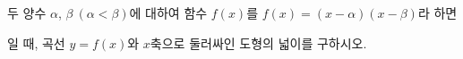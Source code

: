 두 양수 $\alpha$, $\beta\ (\alpha<\beta)$에 대하여 함수 $f(x)$를 $f(x)=(x-\alpha)(x-\beta)$라 하면 \par\smallskip{}\par\smallskip\noindent 일 때, 곡선 $y=f(x)$와 $x$축으로 둘러싸인 도형의 넓이를 구하시오.

